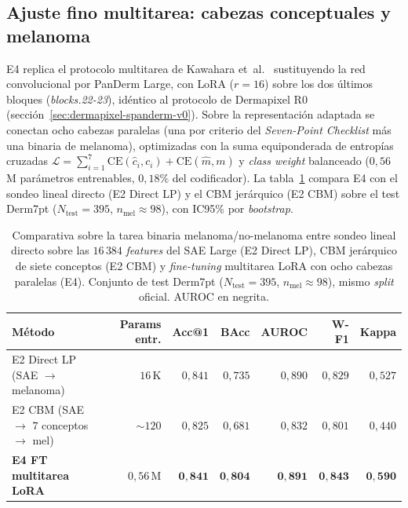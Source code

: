 \subsection*{Ajuste fino multitarea: cabezas conceptuales y
melanoma}
\label{sec:sae-d7pt-e4}

E4 replica el protocolo multitarea de
Kawahara et~al.~\cite{kawahara2019} sustituyendo la red convolucional
por PanDerm Large, con LoRA ($r = 16$) sobre los dos últimos bloques
(\emph{blocks.22-23}), idéntico al protocolo de Dermapixel R0
(sección~\ref{sec:dermapixel-spanderm-v0}). Sobre la representación
adaptada se conectan ocho cabezas paralelas (una por criterio del
\emph{Seven-Point Checklist} más una binaria de melanoma), optimizadas
con la suma equiponderada de entropías cruzadas
$\mathcal{L} = \sum_{i=1}^{7} \mathrm{CE}(\hat{c}_i, c_i) +
\mathrm{CE}(\hat{m}, m)$ y \emph{class weight} balanceado ($0{,}56$\,M
parámetros entrenables, $0{,}18\%$ del codificador). La
tabla~\ref{tab:sae-d7pt-e4-comp} compara E4 con el sondeo lineal
directo (E2 Direct LP) y el CBM jerárquico (E2 CBM) sobre el test
Derm7pt ($N_{\mathrm{test}} = 395$, $n_{\mathrm{mel}} \approx 98$),
con IC95\% por \emph{bootstrap}.

\begin{table}[H]
\centering
\footnotesize
\setlength{\tabcolsep}{4pt}
\renewcommand{\arraystretch}{0.95}
\caption{Comparativa sobre la tarea binaria melanoma/no-melanoma
entre sondeo lineal directo sobre las $16\,384$ \emph{features}
del SAE Large (E2 Direct LP), CBM jerárquico de siete conceptos
(E2 CBM) y \emph{fine-tuning} multitarea LoRA con ocho cabezas
paralelas (E4). Conjunto de test Derm7pt
($N_{\mathrm{test}} = 395$, $n_{\mathrm{mel}} \approx 98$), mismo
\emph{split} oficial. AUROC en negrita.}
\label{tab:sae-d7pt-e4-comp}
\begin{tabular}{lrrrrrr}
\hline
Método                                       & Params entr. & Acc@1     & BAcc      & AUROC              & W-F1      & Kappa     \\
\hline
E2 Direct LP (SAE $\to$ melanoma)             & $16$\,K       & $0{,}841$ & $0{,}735$ & $0{,}890$          & $0{,}829$ & $0{,}527$ \\
E2 CBM (SAE $\to$ $7$ conceptos $\to$ mel)    & $\sim 120$    & $0{,}825$ & $0{,}681$ & $0{,}832$          & $0{,}801$ & $0{,}440$ \\
\textbf{E4 FT multitarea LoRA}                & $0{,}56$\,M   & $\mathbf{0{,}841}$ & $\mathbf{0{,}804}$ & $\mathbf{0{,}891}$ & $\mathbf{0{,}843}$ & $\mathbf{0{,}590}$ \\
\hline
\end{tabular}
\end{table}

